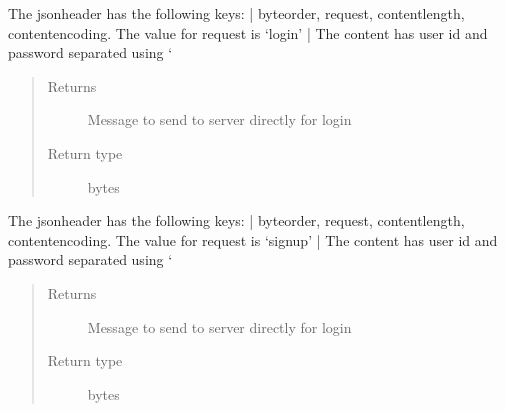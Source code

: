 \documentclass[letterpaper,10pt,english]{sphinxmanual}
\begin{document}
\begin{fulllineitems}
\begin{fulllineitems}
\begin{quote}
\begin{description}
\end{description}\end{quote}

\end{fulllineitems}


\begin{fulllineitems}
\label{\detokenize{Message:Message.Message._create_login_request}}
The jsonheader has the following keys: |
byteorder, request, content\sphinxhyphen{}length, content\sphinxhyphen{}encoding. The value for request is ‘login’ |
The content has user id and password separated using ‘\textquotesingle{}
\begin{quote}\begin{description}
\item[{Returns}] \leavevmode
Message to send to server directly for login

\item[{Return type}] \leavevmode
bytes

\end{description}\end{quote}

\end{fulllineitems}


\begin{fulllineitems}
\label{\detokenize{Message:Message.Message._create_signup_request}}
The jsonheader has the following keys: |
byteorder, request, content\sphinxhyphen{}length, content\sphinxhyphen{}encoding. The value for request is ‘signup’ |
The content has user id and password separated using ‘\textquotesingle{}
\begin{quote}\begin{description}
\item[{Returns}] \leavevmode
Message to send to server directly for login

\item[{Return type}] \leavevmode
bytes

\end{description}\end{quote}


\end{fulllineitems}
\end{fulllineitems}
\end{document}
